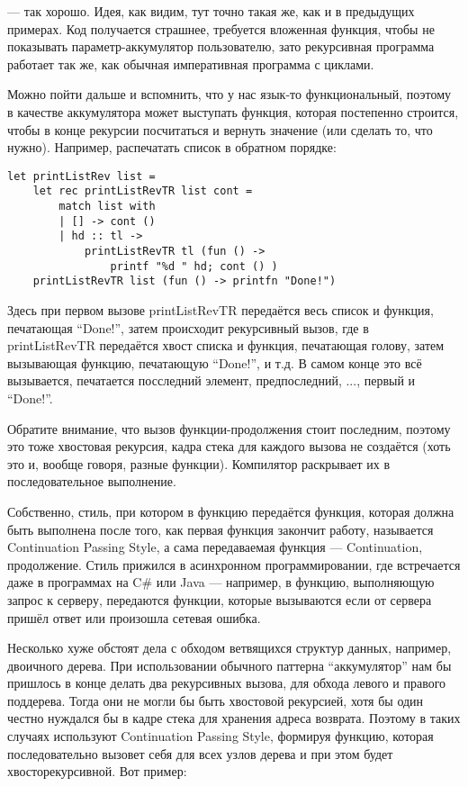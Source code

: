 \documentclass[a5paper]{article}
\begin{document}
--- так хорошо. Идея, как видим, тут точно такая же, как и в предыдущих примерах. Код получается страшнее, требуется вложенная функция, чтобы не показывать параметр-аккумулятор пользователю, зато рекурсивная программа работает так же, как обычная императивная программа с циклами.

Можно пойти дальше и вспомнить, что у нас язык-то функциональный, поэтому в качестве аккумулятора может выступать функция, которая постепенно строится, чтобы в конце рекурсии посчитаться и вернуть значение (или сделать то, что нужно). Например, распечатать список в обратном порядке:

\begin{verbatim}
let printListRev list =
    let rec printListRevTR list cont =
        match list with
        | [] -> cont ()
        | hd :: tl ->
            printListRevTR tl (fun () -> 
                printf "%d " hd; cont () )
    printListRevTR list (fun () -> printfn "Done!")
\end{verbatim}

Здесь при первом вызове printListRevTR передаётся весь список и функция, печатающая ``Done!'', затем происходит рекурсивный вызов, где в printListRevTR передаётся хвост списка и функция, печатающая голову, затем вызывающая функцию, печатающую ``Done!'', и т.д. В самом конце это всё вызывается, печатается посследний элемент, предпоследний, ..., первый и ``Done!''.

Обратите внимание, что вызов функции-продолжения стоит последним, поэтому это тоже хвостовая рекурсия, кадра стека для каждого вызова не создаётся (хоть это и, вообще говоря, разные функции). Компилятор раскрывает их в последовательное выполнение.

Собственно, стиль, при котором в функцию передаётся функция, которая должна быть выполнена после того, как первая функция закончит работу, называется Continuation Passing Style, а сама передаваемая функция --- Continuation, продолжение. Стиль прижился в асинхронном программировании, где встречается даже в программах на C\# или Java --- например, в функцию, выполняющую запрос к серверу, передаются функции, которые вызываются если от сервера пришёл ответ или произошла сетевая ошибка.

Несколько хуже обстоят дела с обходом ветвящихся структур данных, например, двоичного дерева. При использовании обычного паттерна ``аккумулятор'' нам бы пришлось в конце делать два рекурсивных вызова, для обхода левого и правого поддерева. Тогда они не могли бы быть хвостовой рекурсией, хотя бы один честно нуждался бы в кадре стека для хранения адреса возврата. Поэтому в таких случаях используют Continuation Passing Style, формируя функцию, которая последовательно вызовет себя для всех узлов дерева и при этом будет хвосторекурсивной. Вот пример:
\end{document}
